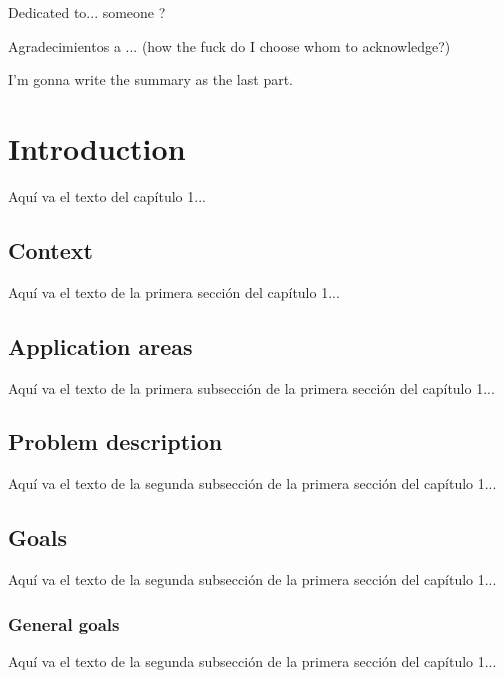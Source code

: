 \documentclass{iccmemoria}
\author{Erik Andrés Regla Torres}
\date{mes, año}
\begin{document}
\maketitle

\begin{dedicatory}
  Dedicated to... someone ?
\end{dedicatory}

\begin{acknowledgment}
  Agradecimientos a ... (how the fuck do I choose whom to acknowledge?)
\end{acknowledgment}

\tableofcontents
\listoffigures
\listoftables

\begin{resumen}
  I'm gonna write the summary as the last part.
\end{resumen}


\chapter{Introduction}
Aquí va el texto del capítulo 1...

\section{Context}
Aquí va el texto de la primera sección del capítulo 1...

\section{Application areas}
Aquí va el texto de la primera subsección de la primera sección del capítulo 1...

\section{Problem description}
Aquí va el texto de la segunda subsección de la primera sección del capítulo 1...

\section{Goals}
Aquí va el texto de la segunda subsección de la primera sección del capítulo 1...

\subsection{General goals}
Aquí va el texto de la segunda subsección de la primera sección del capítulo 1...
\end{document}
